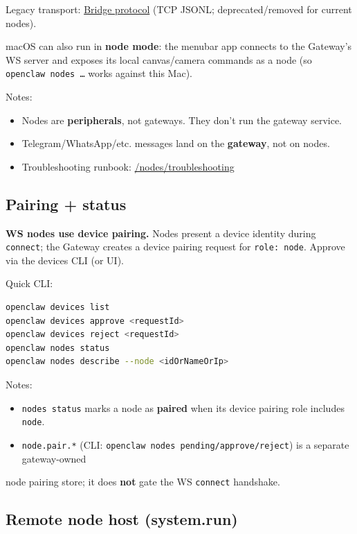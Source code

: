Legacy transport: \href{/gateway/bridge-protocol}{Bridge protocol} (TCP JSONL; deprecated/removed for current nodes).

macOS can also run in \textbf{node mode}: the menubar app connects to the Gateway’s WS server and exposes its local canvas/camera commands as a node (so \texttt{openclaw nodes …} works against this Mac).

Notes:

\begin{itemize}
  \item Nodes are \textbf{peripherals}, not gateways. They don’t run the gateway service.
  \item Telegram/WhatsApp/etc. messages land on the \textbf{gateway}, not on nodes.
  \item Troubleshooting runbook: \href{/nodes/troubleshooting}{/nodes/troubleshooting}
\end{itemize}


\subsection{Pairing + status}


\textbf{WS nodes use device pairing.} Nodes present a device identity during \texttt{connect}; the Gateway
creates a device pairing request for \texttt{role: node}. Approve via the devices CLI (or UI).

Quick CLI:

\begin{lstlisting}[language=bash]
openclaw devices list
openclaw devices approve <requestId>
openclaw devices reject <requestId>
openclaw nodes status
openclaw nodes describe --node <idOrNameOrIp>
\end{lstlisting}


Notes:

\begin{itemize}
  \item \texttt{nodes status} marks a node as \textbf{paired} when its device pairing role includes \texttt{node}.
  \item \texttt{node.pair.*} (CLI: \texttt{openclaw nodes pending/approve/reject}) is a separate gateway-owned
\end{itemize}

node pairing store; it does \textbf{not} gate the WS \texttt{connect} handshake.

\subsection{Remote node host (system.run)}


